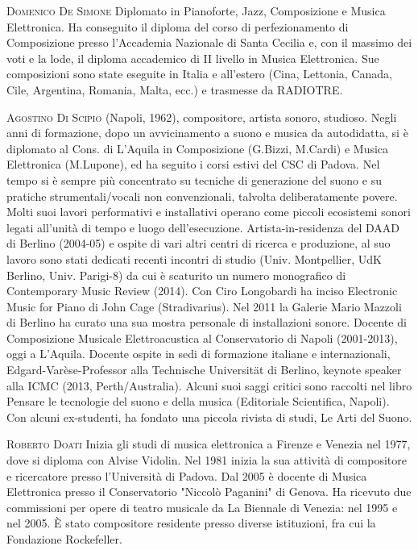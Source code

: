 \documentclass[9pt, twoside, a5paper]{extreport}
\newcommand{\biografia}[2]{%
\noindent \textsc{#1} %
#2 %
\medskip
}%
\begin{document}
\begin{multicols}{2}
\biografia{Domenico De Simone}{Diplomato in Pianoforte, Jazz, Composizione e Musica Elettronica. Ha conseguito il diploma del corso di perfezionamento di Composizione presso l’Accademia Nazionale di Santa Cecilia e, con il massimo dei voti e la lode, il diploma accademico di II livello in Musica Elettronica. Sue composizioni sono state eseguite in Italia e all’estero (Cina, Lettonia, Canada, Cile, Argentina, Romania, Malta, ecc.) e trasmesse da RADIOTRE.}


\biografia{Agostino Di Scipio}{(Napoli, 1962), compositore, artista sonoro, studioso. Negli anni di formazione, dopo un avvicinamento a suono e musica da autodidatta, si è diplomato al Cons. di L'Aquila in Composizione (G.Bizzi, M.Cardi) e Musica Elettronica (M.Lupone), ed ha seguito i corsi estivi del CSC di Padova. Nel tempo si è sempre più concentrato su tecniche di generazione del suono e su pratiche strumentali/vocali non convenzionali, talvolta deliberatamente povere. Molti suoi lavori performativi e installativi operano come piccoli ecosistemi sonori legati all'unità di tempo e luogo dell'esecuzione. Artista-in-residenza del DAAD di Berlino (2004-05) e ospite di vari altri centri di ricerca e produzione, al suo lavoro sono stati dedicati recenti incontri di studio (Univ. Montpellier, UdK Berlino, Univ. Parigi-8) da cui è scaturito un numero monografico di Contemporary Music Review (2014). Con Ciro Longobardi ha inciso Electronic Music for Piano di John Cage (Stradivarius). Nel 2011 la Galerie Mario Mazzoli di Berlino ha curato una sua mostra personale di installazioni sonore. Docente di Composizione Musicale Elettroacustica al Conservatorio di Napoli (2001-2013), oggi a L'Aquila. Docente ospite in sedi di formazione italiane e internazionali, Edgard-Varèse-Professor alla Technische Universität di Berlino, keynote speaker alla ICMC (2013, Perth/Australia). Alcuni suoi saggi critici sono raccolti nel libro Pensare le tecnologie del suono e della musica (Editoriale Scientifica, Napoli). Con alcuni ex-studenti, ha fondato una piccola rivista di studi, Le Arti del Suono.}

\biografia{Roberto Doati}{Inizia gli studi di musica elettronica a Firenze e Venezia nel 1977, dove si diploma con Alvise Vidolin. Nel 1981 inizia la sua attività di compositore e ricercatore presso l'Università di Padova. Dal 2005 è docente di Musica Elettronica presso il Conservatorio "Niccolò Paganini" di Genova. Ha ricevuto due commissioni per opere di teatro musicale da La Biennale di Venezia: nel 1995 e nel 2005. È stato compositore residente presso diverse istituzioni, fra cui la Fondazione Rockefeller.}


\end{multicols}
\end{document}
